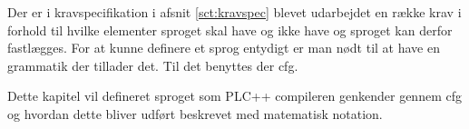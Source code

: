 Der er i kravspecifikation i afsnit \ref{sct:kravspec} blevet udarbejdet en række krav i forhold til hvilke elementer sproget skal have og ikke have og sproget kan derfor fastlægges. For at kunne definere et sprog entydigt er man nødt til at have en grammatik der tillader det. Til det benyttes der \gls{cfg}.


Dette kapitel vil defineret sproget som PLC++ compileren genkender gennem \acrlong{cfg} og hvordan dette bliver udført beskrevet med matematisk notation. 